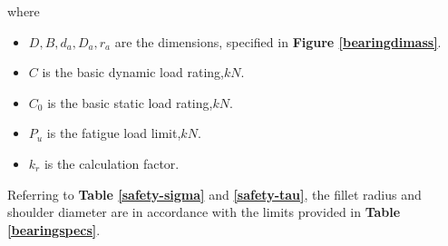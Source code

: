 where
\begin{itemize}
	\item $ D, B, d_a, D_a, r_a $ are the dimensions, specified in \textbf{Figure \ref{bearingdimass}}.
	\item $ C $ is the basic dynamic load rating,$ \unit{kN} $.
	\item $ C_0 $ is the basic static load rating,$ \unit{kN} $.
	\item $ P_u $ is the fatigue load limit,$ \unit{kN} $.
	\item $ k_r $ is the calculation factor.
\end{itemize}

Referring to \textbf{Table \ref{safety-sigma}} and \textbf{\ref{safety-tau}}, the fillet radius and shoulder diameter are in accordance with the limits provided in \textbf{Table \ref{bearingspecs}}.

